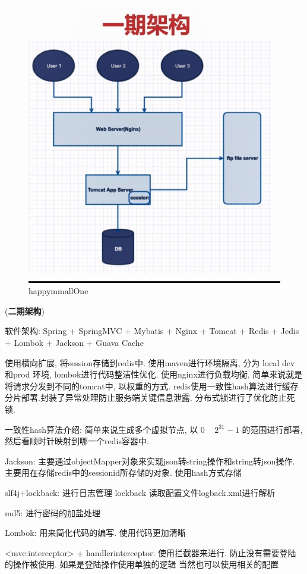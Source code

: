 \documentclass[UTF8]{ctexart}
\begin{document}
\begin{figure}
	\centering
	\includegraphics[width=0.7\linewidth]{figures/happymmallOne.png}
	\caption{happymmallOne}
	\label{fig:happymmallOne}
\end{figure}

(\textbf{二期架构})

软件架构: Spring + SpringMVC + Mybatis + Nginx + Tomcat + Redis + Jedis + Lombok + Jackson + Guava Cache

使用横向扩展, 将session存储到redis中. 使用maven进行环境隔离, 分为 local dev 和prod 环境, lombok进行代码整洁性优化. 使用nginx进行负载均衡, 简单来说就是将请求分发到不同的tomcat中, 以权重的方式. redis使用一致性hash算法进行缓存分片部署.封装了异常处理防止服务端关键信息泄露. 分布式锁进行了优化防止死锁.




一致性hash算法介绍:
简单来说生成多个虚拟节点, 以 0 ~ $2^31-1$ 的范围进行部署, 然后看顺时针映射到哪一个redis容器中.


Jackson: 主要通过objectMapper对象来实现json转string操作和string转json操作. 主要用在存储redis中的sessionid所存储的对象. 使用hash方式存储

slf4j+lockback: 进行日志管理 lockback 读取配置文件logback.xml进行解析

md5: 进行密码的加盐处理

Lombok: 用来简化代码的编写. 使用代码更加清晰

<mvc:interceptor> + handlerinterceptor: 使用拦截器来进行. 防止没有需要登陆的操作被使用. 如果是登陆操作使用单独的逻辑 当然也可以使用相关的配置
\end{document}
